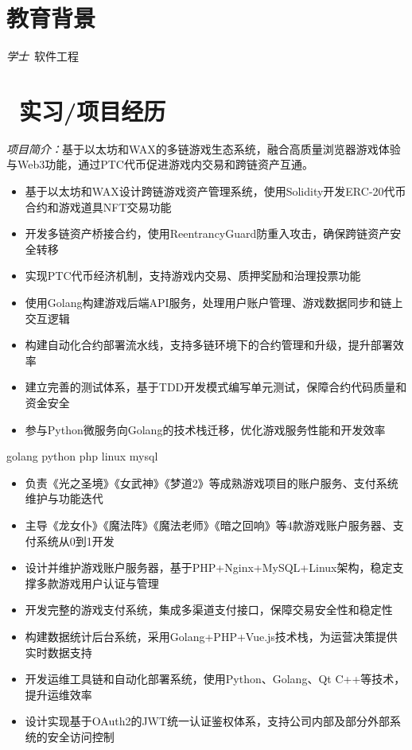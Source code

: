\documentclass{resume}
\begin{document}


 
\section{\faGraduationCap  教育背景}
\textit{学士}\ 软件工程

\section{\faUsers\ 实习/项目经历}
\role{区块链后端开发}

\textit{项目简介：}基于以太坊和WAX的多链游戏生态系统，融合高质量浏览器游戏体验与Web3功能，通过PTC代币促进游戏内交易和跨链资产互通。

\begin{itemize}
  \item 基于以太坊和WAX设计跨链游戏资产管理系统，使用Solidity开发ERC-20代币合约和游戏道具NFT交易功能
  \item 开发多链资产桥接合约，使用ReentrancyGuard防重入攻击，确保跨链资产安全转移
  \item 实现PTC代币经济机制，支持游戏内交易、质押奖励和治理投票功能
  \item 使用Golang构建游戏后端API服务，处理用户账户管理、游戏数据同步和链上交互逻辑
  \item 构建自动化合约部署流水线，支持多链环境下的合约管理和升级，提升部署效率
  \item 建立完善的测试体系，基于TDD开发模式编写单元测试，保障合约代码质量和资金安全
  \item 参与Python微服务向Golang的技术栈迁移，优化游戏服务性能和开发效率
\end{itemize}


 {golang python php linux mysql}

\begin{itemize}
  \item 负责《光之圣境》《女武神》《梦道2》等成熟游戏项目的账户服务、支付系统维护与功能迭代
  \item 主导《龙女仆》《魔法阵》《魔法老师》《暗之回响》等4款游戏账户服务器、支付系统从0到1开发
  \item 设计并维护游戏账户服务器，基于PHP+Nginx+MySQL+Linux架构，稳定支撑多款游戏用户认证与管理
  \item 开发完整的游戏支付系统，集成多渠道支付接口，保障交易安全性和稳定性
  \item 构建数据统计后台系统，采用Golang+PHP+Vue.js技术栈，为运营决策提供实时数据支持
  \item 开发运维工具链和自动化部署系统，使用Python、Golang、Qt C++等技术，提升运维效率
  \item 设计实现基于OAuth2的JWT统一认证鉴权体系，支持公司内部及部分外部系统的安全访问控制
\end{itemize}
\end{document}
